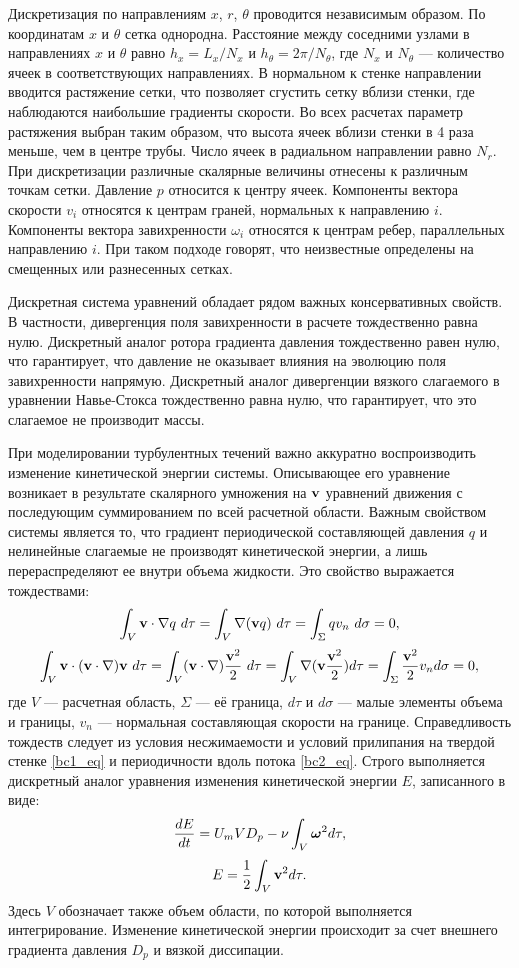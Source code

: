 Дискретизация по направлениям $x$, $r$, $\theta$ проводится независимым образом. По координатам $x$ и $\theta$ сетка однородна. Расстояние между соседними узлами в направлениях $x$ и $\theta$ равно $h_x = L_x / N_x$ и $h_\theta  = 2 \pi / N_\theta$, где $N_x$ и $N_\theta$ --- количество ячеек в соответствующих направлениях. В нормальном к стенке направлении вводится растяжение сетки, что позволяет сгустить сетку вблизи стенки, где наблюдаются наибольшие градиенты скорости. Во всех расчетах параметр растяжения выбран таким образом, что высота ячеек вблизи стенки в 4 раза меньше, чем в центре трубы. Число ячеек в радиальном направлении равно $N_r$. При дискретизации различные скалярные величины отнесены к различным точкам сетки. Давление $p$ относится к центру ячеек. Компоненты вектора скорости $v_i$ относятся к центрам граней, нормальных к направлению $i$. Компоненты вектора завихренности $\omega_i$ относятся к центрам ребер, параллельных направлению $i$. При таком подходе говорят, что неизвестные определены на смещенных или разнесенных сетках. 

Дискретная система уравнений обладает рядом важных консервативных свойств. В частности, дивергенция поля завихренности в расчете тождественно равна нулю. Дискретный аналог ротора градиента давления тождественно равен нулю, что гарантирует, что давление не оказывает влияния на эволюцию поля завихренности напрямую. Дискретный аналог дивергенции вязкого слагаемого в уравнении Навье-Стокса тождественно равна нулю, что гарантирует, что это слагаемое не производит массы. 

При моделировании турбулентных течений важно аккуратно воспроизводить изменение кинетической энергии системы. Описывающее его уравнение возникает в результате скалярного умножения на $\mathbf{v}$ уравнений движения с последующим суммированием по всей расчетной области. Важным свойством системы является то, что градиент периодической составляющей давления $q$ и нелинейные слагаемые не производят кинетической энергии, а лишь перераспределяют ее внутри объема жидкости. Это свойство выражается тождествами:
$$
\int_V \v \cdot \grad q\ d\tau= \int_V \grad (\v q)\ d\tau = \int_{\Sigma} q v_n\ d\sigma = 0, 
$$
$$
\int_V \mathbf{v} \cdot (\mathbf{v} \cdot \nabla) \mathbf{v}\ d\tau = \int_V (\mathbf{v} \cdot \nabla)\frac{\mathbf{v}^2}{2}\ d\tau = \int_V \nabla (\mathbf{v} \frac{\mathbf{v}^2}{2}) d\tau = \int_{\Sigma} \frac{\mathbf{v}^2}{2} v_n d\sigma = 0,
$$
где $V$ --- расчетная область, $\Sigma$ --- её граница, $d\tau$ и $d\sigma$ --- малые элементы объема и границы, $v_n$ --- нормальная составляющая скорости на границе. Справедливость тождеств следует из условия несжимаемости и условий прилипания на твердой стенке \eqref{bc1_eq} и периодичности вдоль потока \eqref{bc2_eq}. Строго выполняется дискретный аналог уравнения изменения кинетической энергии $E$, записанного в виде:
$$
\frac{d E}{d t} = U_mVD_p - \nu \int_{V} \mbox{\boldmath$\omega$}^2 d\tau,
$$
$$
E = \frac{1}{2}\int_{V} \mathbf{v}^2 d\tau.
$$
Здесь $V$ обозначает также объем области, по которой выполняется интегрирование. Изменение кинетической энергии происходит за счет внешнего градиента давления $D_p$ и вязкой диссипации. 

